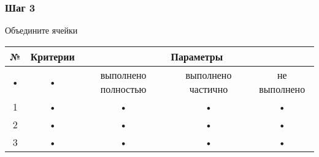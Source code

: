 \documentclass[a4paper,12pt]{article} %
\begin{document}
\subsubsection{Шаг 3}
Объедините ячейки\\
\begin{tabular}{|c|c|c|c|c|}
\hline
№ & Критерии & \multicolumn{3}{|c|}{Параметры} \\
\hline
• & • & выполнено полностью & выполнено частично & не выполнено \\
\hline
1 & • & • & • & • \\
\hline
2 & • & • & • & • \\
\hline
3 & • & • & • & • \\
\hline
\end{tabular}
\end{document}
